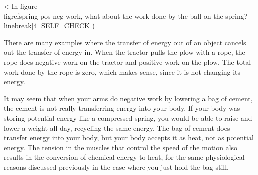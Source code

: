 <%
In figure
\\figref{spring-pos-neg-work}, what about the work done by the ball on the spring?\\linebreak[4]
  SELF_CHECK
  ) %

There are many examples where the transfer of energy out of
an object cancels out the transfer of energy in. When the
tractor pulls the plow with a rope, the rope does negative
work on the tractor and positive work on the plow. The total
work done by the rope is zero, which makes sense, since it
is not changing its energy.

It may seem that when your arms do negative work by lowering
a bag of cement, the cement is not really transferring
energy into your body. If your body was storing potential
energy like a compressed spring, you would be able to raise
and lower a weight all day, recycling the same energy. The
bag of cement does transfer energy into your body, but your
body accepts it as heat, not as potential energy. The
tension in the muscles that control the speed of the motion
also results in the conversion of chemical energy to heat,
for the same physiological reasons discussed previously in
the case where you just hold the bag still.


